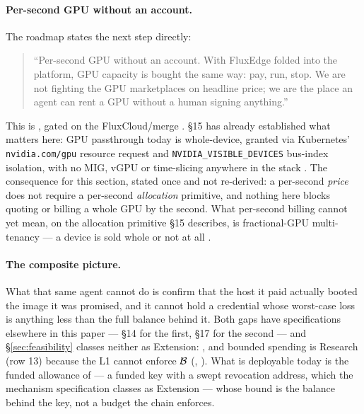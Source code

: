 \paragraph{Per-second GPU without an account.} The roadmap states the next step directly:
\begin{quote}
``Per-second GPU without an account. With FluxEdge folded into the platform, GPU capacity is
bought the same way: pay, run, stop. We are not fighting the GPU marketplaces on headline price;
we are the place an agent can rent a GPU without a human signing anything.''
\end{quote}
This is \planned, gated on the FluxCloud/\FluxEdge merge .
\S15 has already established what matters here: GPU passthrough today is whole-device, granted
via Kubernetes' \texttt{nvidia.com/gpu} resource request and \texttt{NVIDIA\_VISIBLE\_DEVICES}
bus-index isolation, with no MIG, vGPU or time-slicing anywhere in the stack
 . The
consequence for this section, stated once and not re-derived: a per-second \emph{price} does not
require a per-second \emph{allocation} primitive, and nothing here blocks quoting or billing a
whole GPU by the second. What per-second billing cannot yet mean, on the allocation primitive
\S15 describes, is fractional-GPU multi-tenancy --- a device is sold whole or not at all
\srcinferred.

\paragraph{The composite picture.}  What that same agent cannot do is confirm that
the host it paid actually booted the image it was promised, and it cannot hold a credential whose
worst-case loss is anything less than the full balance behind it. Both gaps have specifications
elsewhere in this paper --- \S14 for the first, \S17 for the second --- and \S\ref{sec:feasibility}
classes neither as Extension: , and bounded
spending is Research (row 13) because the L1 cannot enforce $\mathcal{B}$
(, ). What is deployable today is the funded
allowance of  --- a funded key with a swept revocation address, which the
mechanism specification classes as Extension  --- whose
bound is the balance behind the key, not a budget the chain enforces.

